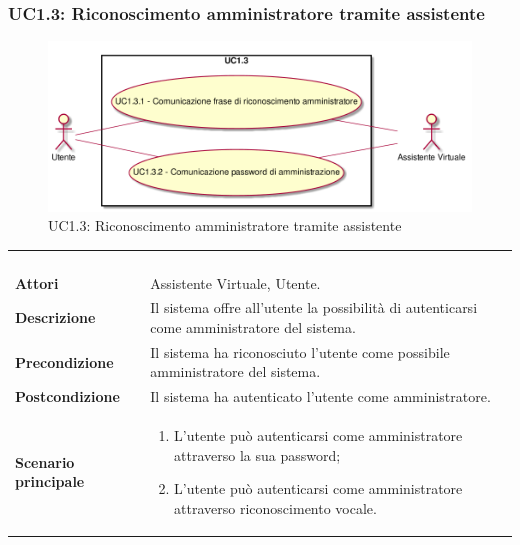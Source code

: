 \newpage\subsubsection{UC1.3: Riconoscimento amministratore tramite assistente}
\label{UC1.3}
\begin{figure}[h]
\centering
\includegraphics[width=\textwidth,height=\textheight,keepaspectratio]{images/UseCaseUC13.png}
\caption{UC1.3: Riconoscimento amministratore tramite assistente}
\end{figure}
\begin{longtable}{l|p{10cm}}
\rowcolor[gray]{0.8} \multicolumn{2}{c}{} \\
\rowcolor[gray]{0.8} \multicolumn{2}{c}{\textbf{UC1.3 - Riconoscimento amministratore tramite assistente}} \\
\rowcolor[gray]{0.8} \multicolumn{2}{c}{} \\
\hline
&\\
\textbf{Attori} & Assistente Virtuale, Utente.\\[7pt]
\textbf{Descrizione} & Il sistema offre all'utente la possibilità di autenticarsi come amministratore del sistema.\\[7pt]
\textbf{Precondizione} & Il sistema ha riconosciuto l'utente come possibile amministratore del sistema.\\[7pt]
\textbf{Postcondizione} & Il sistema ha autenticato l'utente come amministratore. \\[7pt]
\textbf{Scenario principale} &\begin{enumerate}
\item  L'utente può autenticarsi come amministratore attraverso la sua password;
\item  L'utente può autenticarsi come amministratore attraverso riconoscimento vocale.
\end{enumerate}
\\[7pt]\hline
\end{longtable}

